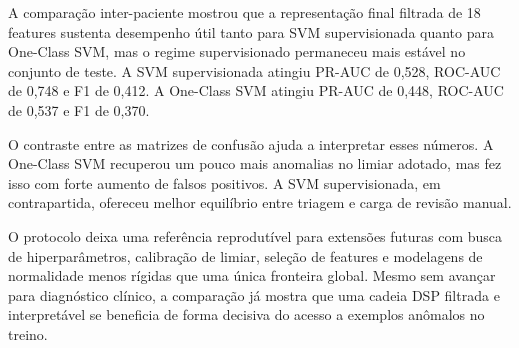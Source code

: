 A comparação inter-paciente mostrou que a representação final filtrada de
18 features sustenta desempenho útil tanto para SVM supervisionada quanto para
One-Class SVM, mas o regime supervisionado permaneceu mais estável no conjunto
de teste. A SVM supervisionada atingiu PR-AUC de 0,528, ROC-AUC de 0,748 e
F1 de 0,412. A One-Class SVM atingiu PR-AUC de 0,448, ROC-AUC de 0,537 e
F1 de 0,370.

O contraste entre as matrizes de confusão ajuda a interpretar esses números. A
One-Class SVM recuperou um pouco mais anomalias no limiar adotado, mas fez isso
com forte aumento de falsos positivos. A SVM supervisionada, em contrapartida,
ofereceu melhor equilíbrio entre triagem e carga de revisão manual.

O protocolo deixa uma referência reprodutível para extensões futuras com busca
de hiperparâmetros, calibração de limiar, seleção de features e modelagens de
normalidade menos rígidas que uma única fronteira global. Mesmo sem avançar
para diagnóstico clínico, a comparação já mostra que uma cadeia DSP filtrada e
interpretável se beneficia de forma decisiva do acesso a exemplos anômalos no
treino.
